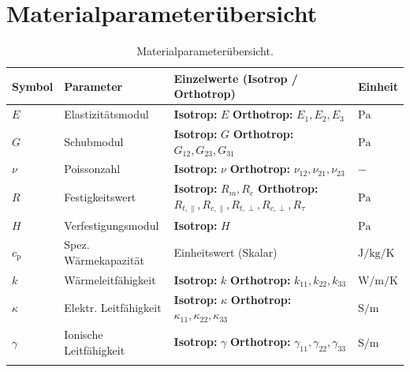\chapter{Materialparameterübersicht}
\begin{table}[!ht]
    \footnotesize
    \centering
    \caption{\label{tab:materialparameter}Materialparameterübersicht.}
    \begin{tabularx}{\textwidth}{@{}llYl@{}}
    \toprule
    \textbf{Symbol} & \textbf{Parameter} & \textbf{Einzelwerte (Isotrop / Orthotrop)} & \textbf{Einheit} \\ \midrule
    $E$ & Elastizitätsmodul & \textbf{Isotrop:} $E$ \newline \textbf{Orthotrop:} $E_1, E_2, E_3$ & $\si{\pascal}$ \\ \addlinespace
    $G$ & Schubmodul & \textbf{Isotrop:} $G$ \newline \textbf{Orthotrop:} $G_{12}, G_{23}, G_{31}$ & $\si{\pascal}$ \\ \addlinespace
    $\nu$ & Poissonzahl & \textbf{Isotrop:} $\nu$ \newline \textbf{Orthotrop:} $\nu_{12}, \nu_{21}, \nu_{23}$ & $-$ \\ \addlinespace
    $R$ & Festigkeitswert & \textbf{Isotrop:} $R_m, R_e$ \newline \textbf{Orthotrop:} $R_{t,\|}, R_{c,\|}, R_{t,\perp}, R_{c,\perp}, R_{\tau}$ & $\si{\pascal}$ \\ \addlinespace
    $H$ & Verfestigungsmodul & \textbf{Isotrop:} $H$ & $\si{\pascal}$ \\ \addlinespace
    $c_{\text{p}}$ & Spez. Wärmekapazität & Einheitswert (Skalar) & $\si{\joule\per\kilogram\per\kelvin}$ \\ \addlinespace
    $k$ & Wärmeleitfähigkeit & \textbf{Isotrop:} $k$ \newline \textbf{Orthotrop:} $k_{11}, k_{22}, k_{33}$ & $\si{\watt\per\metre\per\kelvin}$ \\ \addlinespace
    $\kappa$ & Elektr. Leitfähigkeit & \textbf{Isotrop:} $\kappa$ \newline \textbf{Orthotrop:} $\kappa_{11}, \kappa_{22}, \kappa_{33}$ & $\si{\siemens\per\metre}$ \\ \addlinespace
    $\gamma$ & Ionische Leitfähigkeit & \textbf{Isotrop:} $\gamma$ \newline \textbf{Orthotrop:} $\gamma_{11}, \gamma_{22}, \gamma_{33}$ & $\si{\siemens\per\metre}$ \\ \addlinespace

\end{tabularx}
\end{table}
